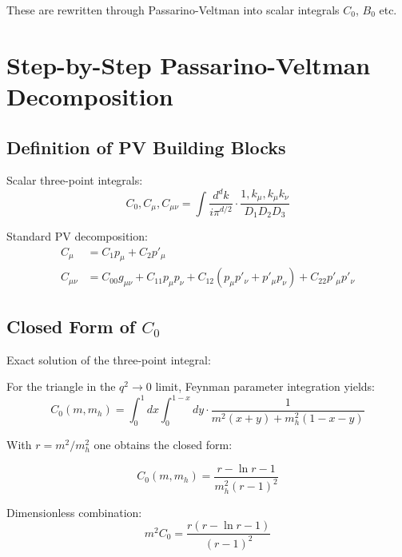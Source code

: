 \documentclass[12pt,a4paper]{article}
\theoremstyle{definition}
\begin{document}
	These are rewritten through Passarino-Veltman into scalar integrals $C_0$, $B_0$ etc.
	
	\section{Step-by-Step Passarino-Veltman Decomposition}
	
	\subsection{Definition of PV Building Blocks}
	
	\begin{pvbox}
		Scalar three-point integrals:
		\begin{equation}
			C_0, C_\mu, C_{\mu\nu} = \int \frac{d^d k}{i\pi^{d/2}} \cdot \frac{1, k_\mu, k_\mu k_\nu}{D_1 D_2 D_3}
		\end{equation}
		
		Standard PV decomposition:
		\begin{align}
			C_\mu &= C_1 p_\mu + C_2 p'_\mu\\
			C_{\mu\nu} &= C_{00} g_{\mu\nu} + C_{11} p_\mu p_\nu + C_{12}(p_\mu p'_\nu + p'_\mu p_\nu) + C_{22} p'_\mu p'_\nu
		\end{align}
	\end{pvbox}
	
	\subsection{Closed Form of $C_0$}
	
	\begin{pvbox}
		Exact solution of the three-point integral:
		
		For the triangle in the $q^2 \to 0$ limit, Feynman parameter integration yields:
		\begin{equation}
			C_0(m, m_h) = \int_0^1 dx \int_0^{1-x} dy \cdot \frac{1}{m^2(x+y) + m_h^2(1-x-y)}
		\end{equation}
		
		With $r = m^2/m_h^2$ one obtains the closed form:
		
		\begin{equation}
			C_0(m, m_h) = \frac{r - \ln r - 1}{m_h^2(r-1)^2}
		\end{equation}
		
		Dimensionless combination:
		\begin{equation}
			m^2C_0 = \frac{r(r - \ln r - 1)}{(r-1)^2}
		\end{equation}
	\end{pvbox}
	
\end{document}
